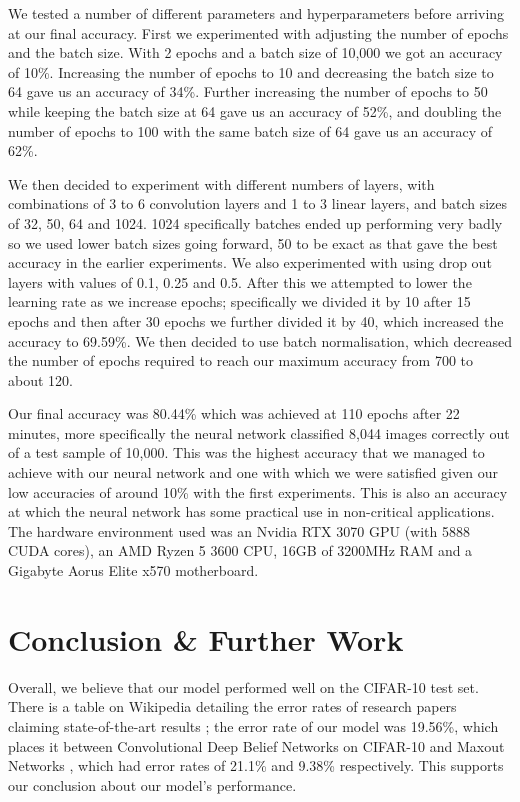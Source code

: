 \documentclass[journal,twoside]{IEEEtran}
\begin{document}
We tested a number of different parameters and hyperparameters before arriving at our final accuracy. First we experimented with adjusting the number of epochs and the batch size. With 2 epochs and a batch size of 10,000 we got an accuracy of 10\%. Increasing the number of epochs to 10 and decreasing the batch size to 64 gave us an accuracy of 34\%. Further increasing the number of epochs to 50 while keeping the batch size at 64 gave us an accuracy of 52\%, and doubling the number of epochs to 100 with the same batch size of 64 gave us an accuracy of 62\%.

We then decided to experiment with different numbers of layers, with combinations of 3 to 6 convolution layers and 1 to 3 linear layers, and batch sizes of 32, 50, 64 and 1024. 1024 specifically batches ended up performing very badly so we used lower batch sizes going forward, 50 to be exact as that gave the best accuracy in the earlier experiments. We also experimented with using drop out layers with values of 0.1, 0.25 and 0.5. After this we attempted to lower the learning rate as we increase epochs; specifically we divided it by 10 after 15 epochs and then after 30 epochs we further divided it by 40, which increased the accuracy to 69.59\%. We then decided to use batch normalisation, which decreased the number of epochs required to reach our maximum accuracy from 700 to about 120.

Our final accuracy was 80.44\% which was achieved at 110 epochs after 22 minutes, more specifically the neural network classified 8,044 images correctly out of a test sample of 10,000. This was the highest accuracy that we managed to achieve with our neural network and one with which we were satisfied given our low accuracies of around 10\% with the first experiments. This is also an accuracy at which the neural network has some practical use in non-critical applications. The hardware environment used was an Nvidia RTX 3070 GPU (with 5888 CUDA cores), an AMD Ryzen 5 3600 CPU, 16GB of 3200MHz RAM and a Gigabyte Aorus Elite x570 motherboard.

\section{Conclusion \& Further Work}
Overall, we believe that our model performed well on the CIFAR-10 test set. There is a table on Wikipedia detailing the error rates of research papers claiming state-of-the-art results \cite{wiki:cifar}; the error rate of our model was 19.56\%, which places it between Convolutional Deep Belief Networks on CIFAR-10 \cite{krizhevsky:belief} and Maxout Networks \cite{goodfellow:maxout}, which had error rates of 21.1\% and 9.38\% respectively. This supports our conclusion about our model's performance.
\end{document}
